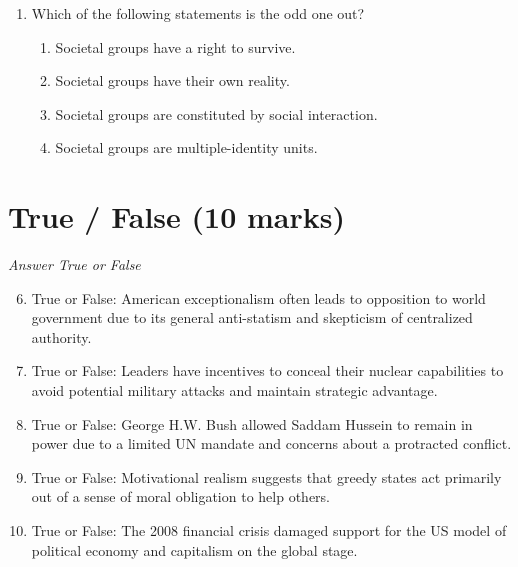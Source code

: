 \documentclass[12pt]{article}
\begin{document}
\begin{enumerate}[label=\arabic*.]
\begin{enumerate}[label=(\alph*)]
    \item The right to privacy is explicitly granted in the Preamble to the Constitution.
    \item The Supreme Court has ruled that the right to privacy is implied by the Bill of Rights.
    \item Common law requires the government to respect citizens' right to privacy.
\end{enumerate}
\item Which of the following statements is the odd one out?
\begin{enumerate}[label=(\alph*)]
    \item Societal groups have a right to survive.
    \item Societal groups have their own reality.
    \item Societal groups are constituted by social interaction.
    \item Societal groups are multiple-identity units.
\end{enumerate}
\end{enumerate}

\section*{True / False (10 marks)}
\textit{Answer True or False}
\begin{enumerate}[label=\arabic*.]
\setcounter{enumi}{5}
\item True or False: American exceptionalism often leads to opposition to world government due to its general anti-statism and skepticism of centralized authority.
\item True or False: Leaders have incentives to conceal their nuclear capabilities to avoid potential military attacks and maintain strategic advantage.
\item True or False: George H.W. Bush allowed Saddam Hussein to remain in power due to a limited UN mandate and concerns about a protracted conflict.
\item True or False: Motivational realism suggests that greedy states act primarily out of a sense of moral obligation to help others.
\item True or False: The 2008 financial crisis damaged support for the US model of political economy and capitalism on the global stage.
\end{enumerate}
\end{document}
